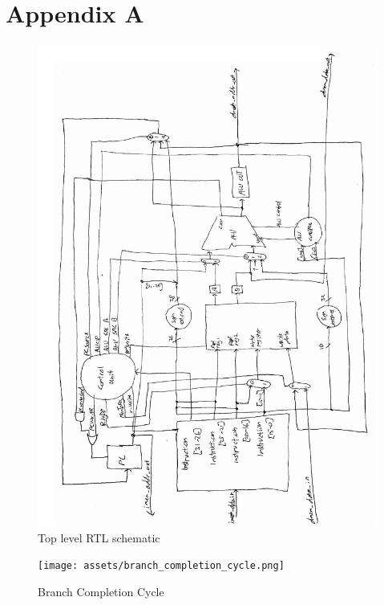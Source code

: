 \section{Appendix A}

\begin{figure}[ht!]
    \begin{center}
    \includegraphics[width=\textwidth]{assets/top_level_rtl.pdf}
    \caption{Top level RTL schematic}
    \label{fig:top_level_rtl}
    \end{center}
\end{figure}

\begin{figure}[ht!]
    \begin{center}
    \texttt{[image: assets/branch\_completion\_cycle.png]}
    \caption{Branch Completion Cycle}
    \label{fig:branch_completion_cycle}
    \end{center}
\end{figure}

